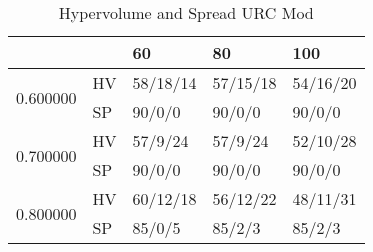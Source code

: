 \begin{table}
\caption{Hypervolume and Spread URC Mod}
\begin{tabular}{lllll}
\toprule
 &  & 60 & 80 & 100 \\
\midrule
\multirow[t]{2}{*}{0.600000} & HV & 58/18/14 & 57/15/18 & 54/16/20 \\
 & SP & 90/0/0 & 90/0/0 & 90/0/0 \\
\cline{1-5}
\multirow[t]{2}{*}{0.700000} & HV & 57/9/24 & 57/9/24 & 52/10/28 \\
 & SP & 90/0/0 & 90/0/0 & 90/0/0 \\
\cline{1-5}
\multirow[t]{2}{*}{0.800000} & HV & 60/12/18 & 56/12/22 & 48/11/31 \\
 & SP & 85/0/5 & 85/2/3 & 85/2/3 \\
\cline{1-5}
\bottomrule
\end{tabular}
\end{table}
